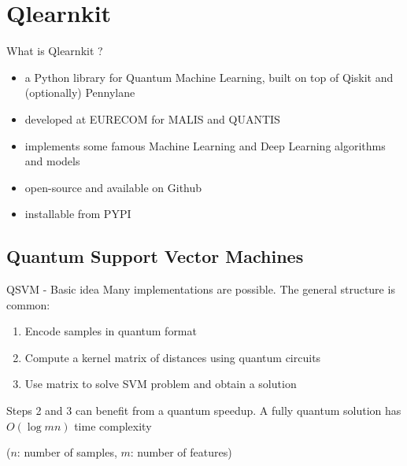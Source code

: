 \graphicspath{{assets/qlearnkit/}}

\section{Qlearnkit}
\begin{frame}{What is Qlearnkit ?}
\begin{itemize}
    \item a Python library for \alert{Quantum Machine Learning}, built on top of \alert{Qiskit} and (optionally) \alert{Pennylane}
    \item developed at EURECOM for \alert{MALIS} and \alert{QUANTIS}
    \item implements some famous Machine Learning and Deep Learning algorithms and models
    \item open-source and available on Github
    \item installable from PYPI
\end{itemize}
\end{frame}


\subsection{Quantum Support Vector Machines}


\begin{frame}{QSVM - Basic idea}
    Many implementations are possible. The general structure is common:
    \begin{enumerate}
        \item Encode samples in quantum format
        \item Compute a kernel matrix of distances using quantum circuits
        \item Use matrix to solve SVM problem and obtain a solution
    \end{enumerate}
    Steps 2 and 3 can benefit from a quantum speedup. A fully quantum solution has $O(\log mn)$ time complexity 
    
    ($n$: number of samples, $m$: number of features)
\end{frame}

